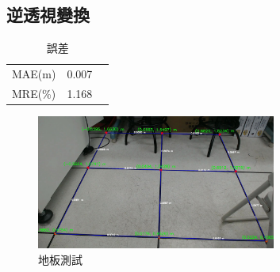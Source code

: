 \documentclass[12pt]{article}       %
\begin{document}

\subsection{逆透視變換}
\hspace{2em}


\begin{table}[H]
    \centering
    \caption{誤差}
    \vspace{6pt} %
    \label{tab:error_comparison}
    \begin{tabular}{lS[table-format=2.2]S[table-format=2.2]}
        \toprule
        MAE(m) & 0.007  \\
        MRE(\%) & 1.168 \\
        \bottomrule
    \end{tabular}
\end{table}



\begin{figure}[H]
    \centering
    \includegraphics[width=0.7\textwidth]{frame_with_points_real.jpg}     %
    \caption{地板測試}    %
    \label{fig:frame_with_points_real}    %
\end{figure}
\end{document}
